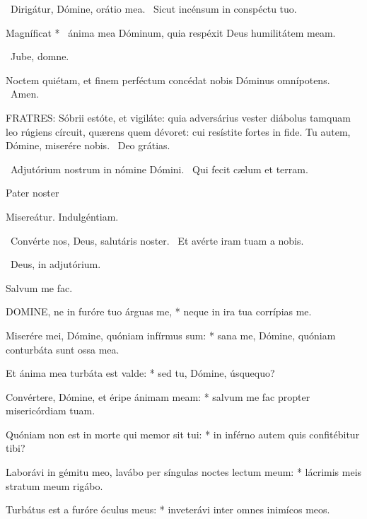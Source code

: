 \V\ Dirigátur, Dómine, orátio mea. \R\ Sicut incénsum in conspéctu tuo.

 Magníficat * \textdagger\ ánima mea Dóminum, quia respéxit Deus humilitátem meam.



\V\ Jube, domne.

 Noctem quiétam, et finem perféctum concédat nobis Dóminus omnípotens. \R\ Amen.


\lettrine[lines=2]{F}{RATRES}: Sóbrii estóte, et vigiláte: quia adversárius vester diábolus tamquam leo rúgiens círcuit, quærens quem dévoret: cui resístite fortes in fide. Tu autem, Dómine, miserére nobis. \R\ Deo grátias.

\V\ Adjutórium nostrum in nómine Dómini. \R\ Qui fecit cælum et terram.

Pater noster 

 Misereátur. Indulgéntiam.

\V\ Convérte nos, Deus, salutáris noster. \R\ Et avérte iram tuam a nobis.

\V\ Deus, in adjutórium.

 Salvum me fac.



\lettrine[lines=2]{D}{OMINE}, ne in furóre tuo árguas me, * neque in ira tua corrípias me.

Miserére mei, Dómine, quóniam infírmus sum: * sana me, Dómine, quóniam conturbáta sunt ossa mea.

Et ánima mea turbáta est valde: * sed tu, Dómine, úsquequo?

Convértere, Dómine, et éripe ánimam meam: * salvum me fac propter misericórdiam tuam.

Quóniam non est in morte qui memor sit tui: * in inférno autem quis confitébitur tibi?

Laborávi in gémitu meo, lavábo per síngulas noctes lectum meum: * lácrimis meis stratum meum rigábo.

Turbátus est a furóre óculus meus: * inveterávi inter omnes inimícos meos.


